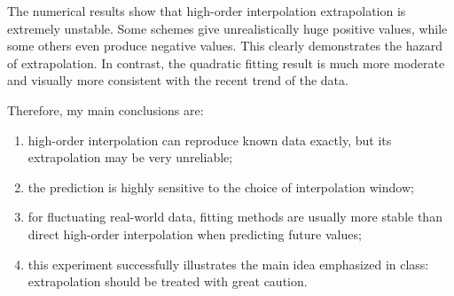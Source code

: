 \documentclass[12pt,a4paper]{article}
\begin{document}
The numerical results show that high-order interpolation extrapolation is extremely unstable. Some schemes give unrealistically huge positive values, while some others even produce negative values. This clearly demonstrates the hazard of extrapolation. In contrast, the quadratic fitting result is much more moderate and visually more consistent with the recent trend of the data.

Therefore, my main conclusions are:
\begin{enumerate}[label=(\arabic*)]
    \item high-order interpolation can reproduce known data exactly, but its extrapolation may be very unreliable;
    \item the prediction is highly sensitive to the choice of interpolation window;
    \item for fluctuating real-world data, fitting methods are usually more stable than direct high-order interpolation when predicting future values;
    \item this experiment successfully illustrates the main idea emphasized in class: extrapolation should be treated with great caution.
\end{enumerate}
\end{document}
